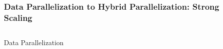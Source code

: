 \documentclass{beamer}
\begin{document}
\begin{frame}
\frametitle{Data Parallelization to Hybrid Parallelization: Strong Scaling}
\begin{columns}
\begin{column}{6cm}
  \begin{center}
{\vspace{-1em}\small    Data Parallelization    }
  \end{center}
\end{column}
\begin{column}{6cm}

\end{column}
\end{columns}
\end{frame}
\end{document}
